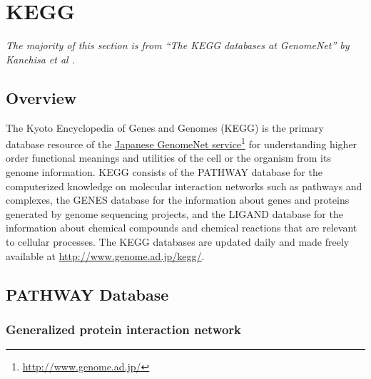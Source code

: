 \section{KEGG}
\label{sect:background_kegg}

\emph{The majority of this section is from ``The KEGG databases at GenomeNet'' by
Kanehisa et al \cite{kegg-basic}.}

\subsection{Overview}
\label{sect:background_kegg_overview}

The Kyoto Encyclopedia of Genes and Genomes (KEGG) is the primary database
resource of the \href{http://www.genome.ad.jp/}{Japanese GenomeNet
service}\footnote{\url{http://www.genome.ad.jp/}} for understanding higher order
functional meanings and utilities of the cell or the organism from its genome
information. KEGG consists of the PATHWAY database for the computerized
knowledge on molecular interaction networks such as pathways and complexes,
the GENES database for the information about genes and proteins generated by
genome sequencing projects, and the LIGAND database for the information about
chemical compounds and chemical reactions that are relevant to cellular
processes. The KEGG databases are updated daily and made freely available at
\url{http://www.genome.ad.jp/kegg/}.

\subsection{PATHWAY Database}
\label{sect:background_kegg_pathway_database}

\subsubsection{Generalized protein interaction network}

